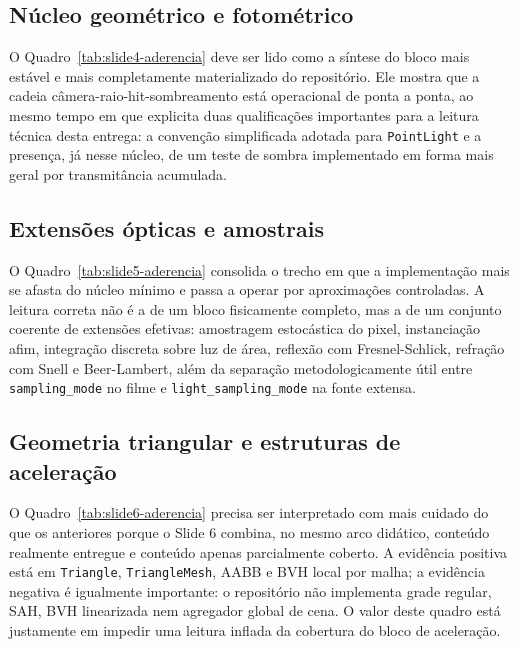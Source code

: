 \documentclass[portuguese]{sbcreviews-2025}%
\begin{document}
\subsection{Núcleo geométrico e fotométrico}

O Quadro~\ref{tab:slide4-aderencia} deve ser lido como a síntese do bloco mais estável e mais completamente materializado do repositório. Ele mostra que a cadeia câmera-raio-hit-sombreamento está operacional de ponta a ponta, ao mesmo tempo em que explicita duas qualificações importantes para a leitura técnica desta entrega: a convenção simplificada adotada para \texttt{PointLight} e a presença, já nesse núcleo, de um teste de sombra implementado em forma mais geral por transmitância acumulada.

\subsection{Extensões ópticas e amostrais}

O Quadro~\ref{tab:slide5-aderencia} consolida o trecho em que a implementação mais se afasta do núcleo mínimo e passa a operar por aproximações controladas. A leitura correta não é a de um bloco fisicamente completo, mas a de um conjunto coerente de extensões efetivas: amostragem estocástica do pixel, instanciação afim, integração discreta sobre luz de área, reflexão com Fresnel-Schlick, refração com Snell e Beer-Lambert, além da separação metodologicamente útil entre \texttt{sampling\_mode} no filme e \texttt{light\_sampling\_mode} na fonte extensa.

\subsection{Geometria triangular e estruturas de aceleração}

O Quadro~\ref{tab:slide6-aderencia} precisa ser interpretado com mais cuidado do que os anteriores porque o Slide 6 combina, no mesmo arco didático, conteúdo realmente entregue e conteúdo apenas parcialmente coberto. A evidência positiva está em \texttt{Triangle}, \texttt{TriangleMesh}, AABB e BVH local por malha; a evidência negativa é igualmente importante: o repositório não implementa grade regular, SAH, BVH linearizada nem agregador global de cena. O valor deste quadro está justamente em impedir uma leitura inflada da cobertura do bloco de aceleração.
\end{document}
